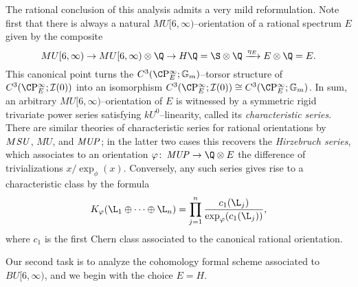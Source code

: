 \begin{remark}
The rational conclusion of this analysis admits a very mild reformulation.  Note first that there is always a natural \(MU[6, \infty)\)--orientation of a rational spectrum \(E\) given by the composite \[MU[6, \infty) \to MU[6, \infty) \otimes \Q \to H\Q = \S \otimes \Q \xrightarrow{\eta_E} E \otimes \Q = E.\]  This canonical point turns the \(C^3(\CP^\infty_E; \Gm)\)--torsor structure of \(C^3(\CP^\infty_E; \sheaf I(0))\) into an isomorphism \(C^3(\CP^\infty_E; \sheaf I(0)) \cong C^3(\CP^\infty_E; \Gm)\).  In sum, an arbitrary \(MU[6, \infty)\)--orientation of \(E\) is witnessed by a symmetric rigid trivariate power series satisfying \(kU^0\)--linearity, called its \textit{characteristic series}.  There are similar theories of characteristic series for rational orientations by \(M\mathit{SU}\), \(MU\), and \(\mathit{MUP}\); in the latter two cases this recovers the \textit{Hirzebruch series}, which associates to an orientation \(\phi\co \MUP \to \Q \otimes E\) the difference of trivializations \(x / \exp_\phi(x)\).  Conversely, any such series gives rise to a characteristic class by the formula \[K_\phi(\L_1 \oplus \cdots \oplus \L_n) = \prod_{j=1}^n \frac{c_1(\L_j)}{\exp_\phi(c_1(\L_j))},\] where \(c_1\) is the first Chern class associated to the canonical rational orientation.
\end{remark}

Our second task is to analyze the cohomology formal scheme associated to \(BU[6, \infty)\), and we begin with the choice \(E = H\).

